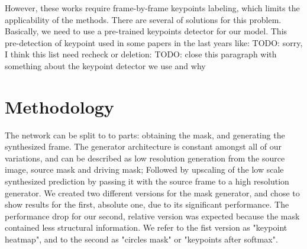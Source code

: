 \documentclass{article}
\begin{document}
However, these works require frame-by-frame keypoints labeling,
which limits the applicability of the methods.
There are several of solutions for this problem.
Basically, we need to use a pre-trained keypoints detector for our model. This pre-detection of keypoint used in some papers in the last years like: TODO: sorry, I think this list need recheck or deletion:
\cite{siarohin2019animating} \cite{thewlis2017unsupervised}
\cite{zhang2018unsupervised} \cite{jakab2018unsupervised}
\cite{newell2016stacked}
TODO: close this paragraph with something about the keypoint detector we use and why


\section{Methodology}
The network can be split to to parts: obtaining the mask, and generating
the synthesized frame. The generator architecture is constant amongst all of
our variations, and can be described as low resolution generation from the
source image, source mask and driving mask; Followed by upscaling of the
low scale synthesized prediction by passing it with the source frame to a
high resolution generator.
We created two different versions for the mask generator, and chose to show
results for the first, absolute one, due to its significant performance. The
performance drop for our second, relative version was expected because the
mask contained less structural information.
We refer to the fist version as "keypoint heatmap", and to the second as
"circles mask" or "keypoints after softmax".
\end{document}
